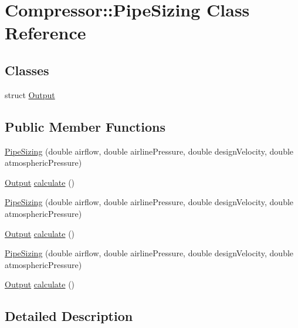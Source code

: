 \hypertarget{class_compressor_1_1_pipe_sizing}{}\section{Compressor\+:\+:Pipe\+Sizing Class Reference}
\label{class_compressor_1_1_pipe_sizing}
\subsection*{Classes}
\begin{DoxyCompactItemize}
\item 
struct \hyperlink{struct_compressor_1_1_pipe_sizing_1_1_output}{Output}
\end{DoxyCompactItemize}
\subsection*{Public Member Functions}
\begin{DoxyCompactItemize}
\item 
\hyperlink{class_compressor_1_1_pipe_sizing_a63d7a8e0780e80938489f160b5996abb}{Pipe\+Sizing} (double airflow, double airline\+Pressure, double design\+Velocity, double atmospheric\+Pressure)
\item 
\hyperlink{struct_compressor_1_1_pipe_sizing_1_1_output}{Output} \hyperlink{class_compressor_1_1_pipe_sizing_a9212c8d52ff658c412752cee18d6b28d}{calculate} ()
\item 
\hyperlink{class_compressor_1_1_pipe_sizing_a63d7a8e0780e80938489f160b5996abb}{Pipe\+Sizing} (double airflow, double airline\+Pressure, double design\+Velocity, double atmospheric\+Pressure)
\item 
\hyperlink{struct_compressor_1_1_pipe_sizing_1_1_output}{Output} \hyperlink{class_compressor_1_1_pipe_sizing_a0b4a10531fb9a8c3bb9aae0441ed5182}{calculate} ()
\item 
\hyperlink{class_compressor_1_1_pipe_sizing_a63d7a8e0780e80938489f160b5996abb}{Pipe\+Sizing} (double airflow, double airline\+Pressure, double design\+Velocity, double atmospheric\+Pressure)
\item 
\hyperlink{struct_compressor_1_1_pipe_sizing_1_1_output}{Output} \hyperlink{class_compressor_1_1_pipe_sizing_a0b4a10531fb9a8c3bb9aae0441ed5182}{calculate} ()
\end{DoxyCompactItemize}


\subsection{Detailed Description}


